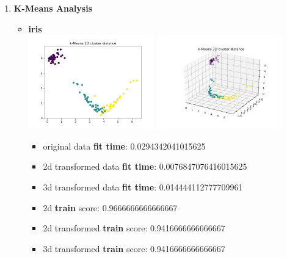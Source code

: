 \documentclass[12pt]{article}
\begin{document}
\begin{enumerate}[leftmargin=\parindent,align=left,labelwidth=\parindent,noitemsep]
\item \textbf{K-Means Analysis}
\begin{itemize}[noitemsep,topsep=1pt]
    \item \textbf{iris} \\
    \includegraphics[width=0.45\textwidth]{kmeans_iris_2d} \includegraphics[width=0.45\textwidth]{kmeans_iris_3d} \\
    \begin{itemize}
        \item original data \textbf{fit time}: 0.0294342041015625
        \item 2d transformed data \textbf{fit time}: 0.0076847076416015625
        \item 3d transformed data \textbf{fit time}: 0.014444112777709961 \\

        \item 2d \textbf{train} score: 0.9666666666666667
        \item 2d transformed \textbf{train} score: 0.9416666666666667
        \item 3d transformed \textbf{train} score: 0.9416666666666667 \\


\end{itemize}
\end{itemize}
\end{enumerate}
\end{document}
